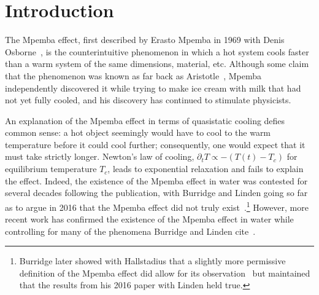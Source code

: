 \documentclass[hyperref={colorlinks=true, urlcolor=blue, citecolor=blue, final, bound}]{sfuthesis}
\begin{document}
%
\tableofcontents%
\clearpage


%
\listoffigures%
\clearpage


\mainmatter%

\chapter{Introduction}
The Mpemba effect, first described by Erasto Mpemba in 1969 with Denis Osborne~\cite{Mpemba1969}, is the counterintuitive phenomenon in which a hot system cools faster than a warm system of the same dimensions, material, etc. Although some claim that the phenomenon was known as far back as Aristotle~\cite{Burridge2016}, Mpemba independently discovered it while trying to make ice cream with milk that had not yet fully cooled, and his discovery has continued to stimulate physicists.

An explanation of the Mpemba effect in terms of quasistatic cooling defies common sense: a hot object seemingly would have to cool to the warm temperature before it could cool further; consequently, one would expect that it must take strictly longer. Newton's law of cooling, $\partial_t T \propto -(T(t)-T_c)$ for equilibrium temperature $T_c$, leads to exponential relaxation and fails to explain the effect. Indeed, the existence of the Mpemba effect in water was contested for several decades following the publication, with Burridge and Linden going so far as to argue in 2016 that the Mpemba effect did not truly exist~\cite{Burridge2016}.\footnote{Burridge later showed with Hallstadius that a slightly more permissive definition of the Mpemba effect did allow for its observation~\cite{Burridge2020} but maintained that the results from his 2016 paper with Linden held true.} However, more recent work has confirmed the existence of the Mpemba effect in water while controlling for many of the phenomena Burridge and Linden cite~\cite{Brownridge2025a}. 
\end{document}
